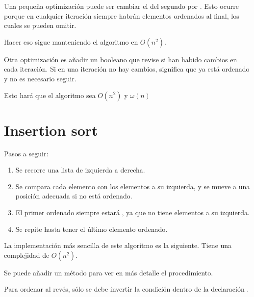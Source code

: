 Una pequeña optimización puede ser cambiar el  del segundo  por .
Esto ocurre porque en cualquier iteración siempre habrán  elementos ordenados al final, los cuales se pueden omitir.


Hacer eso sigue manteniendo el algoritmo en $O(n^2)$.

Otra optimización es añadir un booleano que revise si han habido cambios en cada iteración.
Si en una iteración no hay cambios, significa que ya está ordenado y no es necesario seguir.


Esto hará que el algoritmo sea $O(n^2)$ y $\omega(n)$

\section{Insertion sort}

Pasos a seguir:

\begin{enumerate}
  \item Se recorre una lista de izquierda a derecha.
  
  \item Se compara cada elemento con los elementos a su izquierda, y se mueve a una posición adecuada si no está ordenado.

  \item El primer ordenado siempre estará , ya que no tiene elementos a su izquierda.
  
  \item Se repite hasta tener el último elemento ordenado.
  
\end{enumerate}

La implementación más sencilla de este algoritmo es la siguiente.
Tiene una complejidad de $O(n^2)$.


Se puede añadir un método  para ver en más detalle el procedimiento.


Para ordenar al revés, sólo se debe invertir la condición dentro de la declaración .

